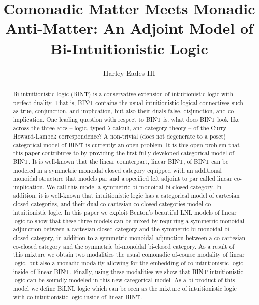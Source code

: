 \documentclass{lmcs}
\date{}
\begin{document}
\title{Comonadic Matter Meets Monadic Anti-Matter: An Adjoint Model of Bi-Intuitionistic Logic}
\author{Harley Eades III}
\address{Computer and Information Sciences, Augusta University, Augusta, GA}

\maketitle 

\begin{abstract}

  Bi-intuitionistic logic (BINT) is a conservative extension of
  intuitionistic logic with perfect duality.  That is, BINT contains
  the usual intuitionistic logical connectives such as true,
  conjunction, and implication, but also their duals false,
  disjunction, and co-implication. One leading question with respect
  to BINT is, what does BINT look like across the three arcs -- logic,
  typed $\lambda$-calculi, and category theory -- of the
  Curry-Howard-Lambek correspondence?  A non-trivial (does not
  degenerate to a poset) categorical model of BINT is currently an
  open problem.  It is this open problem that this paper contributes
  to by providing the first fully developed categorical model of BINT.
  It is well-known that the linear counterpart, linear BINT, of BINT
  can be modeled in a symmetric monoidal closed category equipped with
  an additional monoidal structure that models par and a specified
  left adjoint to par called linear co-implication.  We call this
  model a symmetric bi-monoidal bi-closed category. In addition, it is
  well-known that intuitionistic logic has a categorical model of
  cartesian closed categories, and their dual co-cartesian co-closed
  categories model co-intuitionistic logic.  In this paper we exploit
  Benton's beautiful LNL models of linear logic to show that these
  three models can be mixed by requiring a symmetric monoidal
  adjunction between a cartesian closed category and the symmetric
  bi-monoidal bi-closed category, in addition to a symmetric monoidal
  adjunction between a co-cartesian co-closed category and the
  symmetric bi-monoidal bi-closed category.  As a result of this
  mixture we obtain two modalities the usual comonadic of-course
  modality of linear logic, but also a monadic modality allowing for
  the embedding of co-intuitionistic logic inside of linear BINT.
  Finally, using these modalities we show that BINT intuitionistic
  logic can be soundly modeled in this new categorical model. As a
  bi-product of this model we define BiLNL logic which can be seen as
  the mixture of intuitionistic logic with co-intuitionistic logic
  inside of linear BINT.

\end{abstract}
\end{document}
